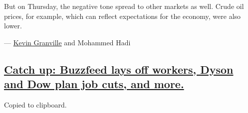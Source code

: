But on Thursday, the negative tone spread to other markets as well.
Crude oil prices, for example, which can reflect expectations for the
economy, were also lower.

--- \href{https://www.nytimes.com/by/kevin-granville}{Kevin Granville}
and Mohammed Hadi

\hypertarget{catch-up-buzzfeed-lays-off-workers-dyson-and-dow-plan-job-cuts-and-more}{%
\subsection{\texorpdfstring{\protect\hyperlink{catch-up-buzzfeed-lays-off-workers-dyson-and-dow-plan-job-cuts-and-more}{Catch
up: Buzzfeed lays off workers, Dyson and Dow plan job cuts, and
more.}}{Catch up: Buzzfeed lays off workers, Dyson and Dow plan job cuts, and more.}}\label{catch-up-buzzfeed-lays-off-workers-dyson-and-dow-plan-job-cuts-and-more}}

Copied to clipboard.

